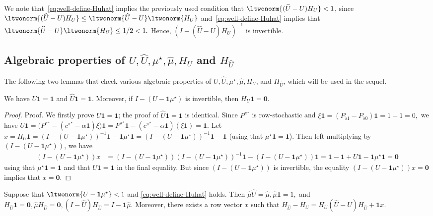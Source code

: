 \documentclass[mnsc,nonblindrev]{informs3}
\newcommand{\one}{\mathbf{1}}
\newcommand{\pistar}{\pi^\star}
\newcommand{\zero}{\mathbf{0}}
\newcommand{\muhat}{\widehat{\mu}}
\newcommand{\uhat}{\widehat{U}}
\begin{document}
\begin{APPENDICES}
We note that~\eqref{eq:well-define-Huhat} implies the previously used condition that $\ltwonorm{(\uhat-U)H_U}< 1$, since $\ltwonorm{(\uhat-U)H_U} \leq \ltwonorm{\uhat-U}\ltwonorm{H_U}$ and~\eqref{eq:well-define-Huhat} implies that
$
    \ltwonorm{\uhat-U}\ltwonorm{H_U} \leq  1/2 < 1. 
$ Hence, $(I - (\uhat-U)H_U)^{-1}$ is invertible.
\subsection{Algebraic properties of $U, \uhat, \mu^\star, \muhat, H_U$ and $H_{\uhat}$}\label{subsec:properties}
The following two lemmas that check various algebraic properties of $U, \uhat, \mu^\star, \muhat, H_U$, and $H_{\uhat}$, which will be used in the sequel.

\begin{lemma}
\label{lem:basic-U-HU-identities}
We have \(U\one=\one\) and \(\uhat\one=\one\). Moreover, if
\(I-(U-\one\mu^\star)\) is invertible, then \(H_U\one=\zero\).
\end{lemma}
\begin{proof}{Proof.}
We firstly prove \(U\one=\one\); the proof of \(\uhat\one=\one\) is identical.
Since \(P^{\pistar}\) is row-stochastic and
\(
    \xi\one
    =
    (P_{\tilde s1}-P_{\tilde s0})\one
    =
    1-1
    =
    0,
\)
we have
\(
    U\one
    =
    \bigl(P^{\pistar}-(c^{\pistar}-\alpha\one)\xi\bigr)\one
    =
    P^{\pistar}\one
    -
    (c^{\pistar}-\alpha\one)(\xi\one)
    =
    \one .
\)
Let $x = H_U \one = (I - (U - \one \mu^\star))^{-1} \one - \one\mu^\star \one = (I - (U - \one \mu^\star))^{-1} \one - \one$ (using that $\mu^\star \one = \one$). Then left-multiplying by $(I - (U - \one \mu^\star))$, we have
    \begin{align*}
        (I - (U - \one \mu^\star)) x &= (I - (U - \one \mu^\star))(I - (U - \one \mu^\star))^{-1} \one - (I - (U - \one \mu^\star)) \one 
        = \one - \one + U \one - \one \mu^\star \one 
        = \zero
    \end{align*}
    using that $\mu^\star \one = \one$ and that $U \one = \one$ in the final equality. But since $(I - (U - \one \mu^\star))$ is invertible, the equality $(I - (U - \one \mu^\star)) x = \zero$ implies that $x = \zero$.
\end{proof}

\begin{lemma}
\label{lem:perturbed-Uhat-Huhat-identities}
Suppose that \(\ltwonorm{U-\one\mu^\star}<1\) and
\eqref{eq:well-define-Huhat} holds. Then
\(
    \muhat\uhat=\muhat,
    \muhat\one=1,
\) and
\(
    H_{\uhat}\one=\zero,
    \muhat H_{\uhat}=\zero,
    (I-\uhat)H_{\uhat}=I-\one\muhat.
\)
Moreover, there exists a row vector \(x\) such that
\(
    H_{\uhat}-H_U
    =
    H_U(\uhat-U)H_{\uhat}+\one x.
\)
\end{lemma}



\end{APPENDICES}
\end{document}
